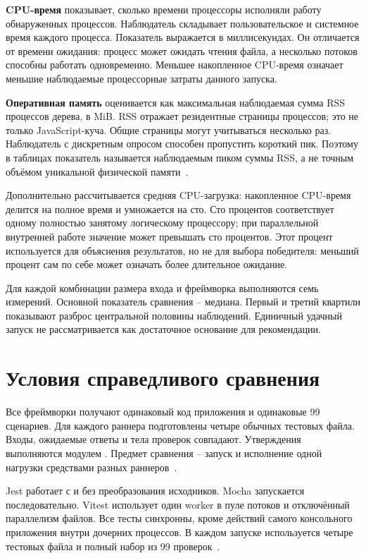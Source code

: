 \textbf{CPU-время} показывает, сколько времени процессоры исполняли работу обнаруженных процессов. Наблюдатель складывает пользовательское и системное время каждого процесса. Показатель выражается в миллисекундах. Он отличается от времени ожидания: процесс может ожидать чтения файла, а несколько потоков способны работать одновременно. Меньшее накопленное CPU-время означает меньшие наблюдаемые процессорные затраты данного запуска.

\textbf{Оперативная память} оценивается как максимальная наблюдаемая сумма RSS процессов дерева, в MiB. RSS отражает резидентные страницы процессов; это не только JavaScript-куча. Общие страницы могут учитываться несколько раз. Наблюдатель с дискретным опросом способен пропустить короткий пик. Поэтому в таблицах показатель называется наблюдаемым пиком суммы RSS, а не точным объёмом уникальной физической памяти~\cite{psutil}.

Дополнительно рассчитывается средняя CPU-загрузка: накопленное CPU-время делится на полное время и умножается на сто. Сто процентов соответствует одному полностью занятому логическому процессору; при параллельной внутренней работе значение может превышать сто процентов. Этот процент используется для объяснения результатов, но не для выбора победителя: меньший процент сам по себе может означать более длительное ожидание.

Для каждой комбинации размера входа и фреймворка выполняются семь измерений. Основной показатель сравнения -- медиана. Первый и третий квартили показывают разброс центральной половины наблюдений. Единичный удачный запуск не рассматривается как достаточное основание для рекомендации.

\section{Условия справедливого сравнения}
Все фреймворки получают одинаковый код приложения и одинаковые 99 сценариев. Для каждого раннера подготовлены четыре обычных тестовых файла. Входы, ожидаемые ответы и тела проверок совпадают. Утверждения выполняются модулем . Предмет сравнения -- запуск и исполнение одной нагрузки средствами разных раннеров~\cite{node-assert}.

Jest работает с  и без преобразования исходников. Mocha запускается последовательно. Vitest использует один worker в пуле потоков и отключённый параллелизм файлов. Все тесты синхронны, кроме действий самого консольного приложения внутри дочерних процессов. В каждом запуске используется четыре тестовых файла и полный набор из 99 проверок~\cite{jest-cli,jest-config,mocha-cli,vitest-config}.


